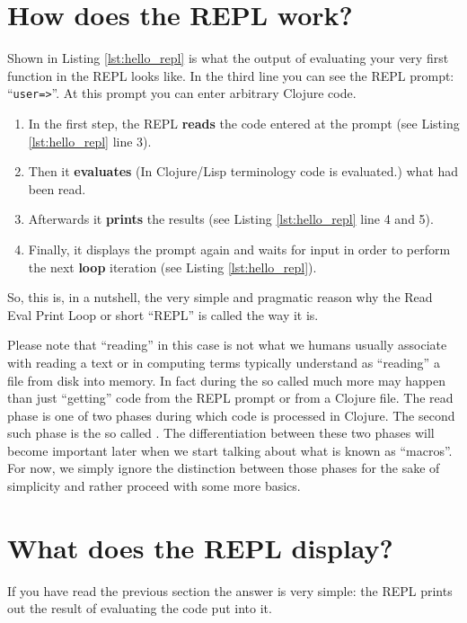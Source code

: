 \section{How does the REPL work?}
Shown in Listing \vref{lst:hello_repl} is what the output of evaluating your very first function in the REPL looks like.
In the third line you can see the REPL prompt: ``\texttt{user=>}''.
At this prompt you can enter arbitrary Clojure code.

\begin{enumerate}
  \item In the first step, the REPL \textbf{reads} the code entered at the prompt (see Listing \vref{lst:hello_repl} line 3).
  \item Then it \textbf{evaluates} (In Clojure/Lisp terminology code is evaluated.) what had been read.
  \item Afterwards it \textbf{prints} the results (see Listing \vref{lst:hello_repl} line 4 and 5).
  \item Finally, it displays the prompt again and waits for input in order to perform the next \textbf{loop} iteration (see Listing \vref{lst:hello_repl}).
\end{enumerate}

So, this is, in a nutshell, the very simple and pragmatic reason why the Read Eval Print Loop or short ``REPL'' is called the way it is.

Please note that ``reading'' in this case is not what we humans usually associate with reading a text or in computing terms typically understand as ``reading'' a file from disk into memory.
In fact during the so called  much more may happen than just ``getting'' code from the REPL prompt or from a Clojure file.
The read phase is one of two phases during which code is processed in Clojure.
The second such phase is the so called .
The differentiation between these two phases will become important later when we start talking about what is known as ``macros''.
For now, we simply ignore the distinction between those phases for the sake of simplicity and rather proceed with some more basics.

\section{What does the REPL display?}
If you have read the previous section the answer is very simple:
the REPL prints out the result of evaluating the code put into it.

